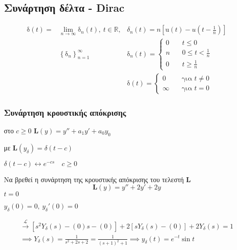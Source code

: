 \documentclass[11pt,a4paper,titlepage,final]{article}
\begin{document}
\subsection{Συνάρτηση δέλτα - \textlatin{Dirac}}
\begin{align*}
\mathrm{\delta}(t) =& \lim_{n\to \infty}\mathrm \delta_n(t),\ t \in \mathbb R, & \delta_n(t) = n \left[
\mathrm u(t) - u\left(t-\frac{1}{n}\right)
\right] \\
&
\left\lbrace \mathrm \delta_n \right\rbrace_{n=1}^\infty
& \mathrm{\delta}_n(t) = \begin{cases}
0 \quad& t\leq0 \\ n \quad& 0 \leq t < \frac{1}{n} \\ 0 \quad& t \geq \frac{1}{n}
\end{cases} \\ & & \mathrm \delta(t) = \begin{cases}
0 \quad& \text{για } t \neq 0\\
\infty \quad& \text{για } t = 0
\end{cases}
\end{align*}

\subsubsection{Συνάρτηση κρουστικής απόκρισης}
στο \( c \geq 0 \) \( \boxed{\mathbf L(y) = y''+a_1y'+a_0y_0} \)

με \( \mathbf L(y_\delta) = \delta (t-c) \)

\( \delta(t-c) \leftrightarrow e^{-cs} \quad c \geq 0 \)

\begin{exercise*}{13.4}
	Να βρεθεί η συνάρτηση της κρουστικής απόκρισης του τελεστή \( \mathbf L \)
	\[
	\mathbf L (y) = y''+2y'+2y
	\]
	\( t=0 \)
		\tcblower
	
	\( y_\delta(0) = 0,\ y_\delta'(0) = 0 \)

	
	\begin{gather*}
	\xrightarrow{\mathscr L}
	\left[
	s^2Y_\delta(s) - (0)s-(0)
	\right] + 2 \left[sY_\delta(s)-(0) \right] +2Y_\delta(s) = 1
	\\ \implies Y_\delta(s) = \frac{1}{s^2+2s+2} = \frac{1}{(s+1)^2+1} \implies \boxed{y_\delta(t) = e^{-t}\sin t}
	\end{gather*}
\end{exercise*}
\end{document}
